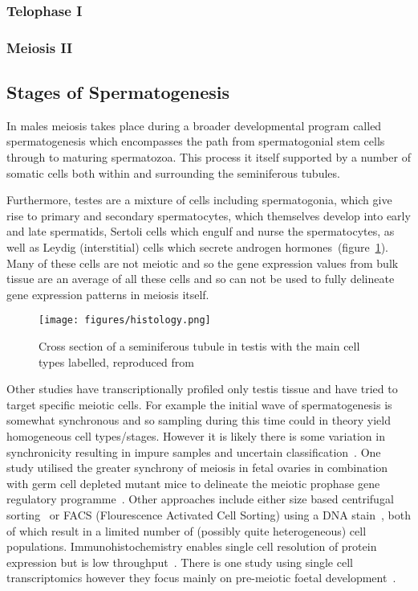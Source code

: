 \subsubsection{Telophase I}

\subsubsection{Meiosis II}


\subsection{Stages of Spermatogenesis}
In males meiosis takes place during a broader developmental program called spermatogenesis which encompasses the path from spermatogonial stem cells through to maturing spermatozoa. This process it itself supported by a number of somatic cells both within and surrounding the seminiferous tubules.

 Furthermore, testes are a mixture of cells including spermatogonia, which give rise to primary and secondary spermatocytes, which themselves develop into early and late spermatids, Sertoli cells which engulf and nurse the spermatocytes, as well as Leydig (interstitial) cells which secrete androgen hormones~(figure~\ref{fig:histology}). Many of these cells are not meiotic and so the gene expression values from bulk tissue are an average of all these cells and so can not be used to fully delineate gene expression patterns in meiosis itself.

\begin{figure}[H]
	\centering
	\texttt{[image: figures/histology.png]}
	\caption{Cross section of a seminiferous tubule in testis with the main cell types labelled, reproduced from~\cite{Junqueira2005Basic}}
	\label{fig:histology}
\end{figure}

Other studies have transcriptionally profiled only testis tissue and have tried to target specific meiotic cells. For example the initial wave of spermatogenesis is somewhat synchronous and so sampling during this time could in theory yield homogeneous cell types/stages. However it is likely there is some variation in synchronicity resulting in impure samples and uncertain classification~\cite{Laiho2013Transcriptome,Ball2016Regulatory}. One study utilised the greater synchrony of meiosis in fetal ovaries in combination with germ cell depleted mutant mice to delineate the meiotic prophase gene regulatory programme~\cite{Soh2015Gene}. Other approaches include either size based centrifugal sorting~\cite{Soumillon2013Cellular,Buard2009Distinct,Grabske1975Centrifugal} or FACS (Flourescence Activated Cell Sorting) using a DNA stain~\cite{daCruz2016Transcriptome}, both of which result in a limited number of (possibly quite heterogeneous) cell populations. Immunohistochemistry enables single cell resolution of protein expression but is low throughput~\cite{Djureinovic2014human}. There is one study using single cell transcriptomics however they focus mainly on pre-meiotic foetal development~\cite{Li2017SingleCell}.

